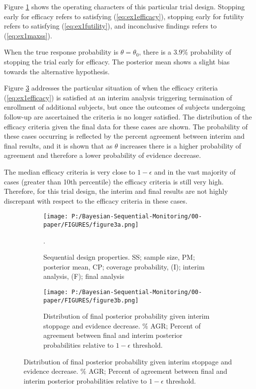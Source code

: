 \documentclass[12pt]{article}
\begin{document}
Figure \ref{fig:ex1operatingcharacteristics} shows the operating characters of this particular trial design. Stopping early for efficacy refers to satisfying (\ref{eq:ex1efficacy}), stopping early for futility refers to satisfying (\ref{eq:ex1futility}), and inconclusive findings refers to (\ref{eq:ex1maxss}). 

When the true response probability is $\theta=\theta_0$, there is a $3.9\%$ probability of stopping the trial early for efficacy. The posterior mean shows a slight bias towards the alternative hypothesis.

Figure \ref{fig:ex1evidencedecrease} addresses the particular situation of when the efficacy criteria (\ref{eq:ex1efficacy}) is satisfied at an interim analysis triggering termination of enrollment of additional subjects, but once the outcomes of subjects undergoing follow-up are ascertained the criteria is no longer satisfied. The distribution of the efficacy criteria given the final data for these cases are shown. The probability of these cases occurring is reflected by the percent agreement between interim and final results, and it is shown that as $\theta$ increases there is a higher probability of agreement and therefore a lower probability of evidence decrease.

The median efficacy criteria is very close to $1-\epsilon$ and in the vast majority of cases (greater than 10th percentile) the efficacy criteria is still very high. Therefore, for this trial design, the interim and final results are not highly discrepant with respect to the efficacy criteria in these cases.
\begin{figure}
  \begin{subfigure}{6in}
    \centering\texttt{[image: P:/Bayesian-Sequential-Monitoring/00-paper/FIGURES/figure3a.png]}
    \caption{Sequential design properties. SS; sample size, PM; posterior mean, CP; coverage probability, (I); interim analysis, (F); final analysis}.
	\label{fig:ex1operatingcharacteristics}
  \end{subfigure}
  \begin{subfigure}{6in}
    \centering\texttt{[image: P:/Bayesian-Sequential-Monitoring/00-paper/FIGURES/figure3b.png]}
    \caption{Distribution of final posterior probability given interim stoppage and evidence decrease. $\%$ AGR; Percent of agreement between final and interim posterior probabilities relative to $1-\epsilon$ threshold.}
	\label{fig:ex1evidencedecrease}
  \end{subfigure}
 
\end{figure}
\end{document}
